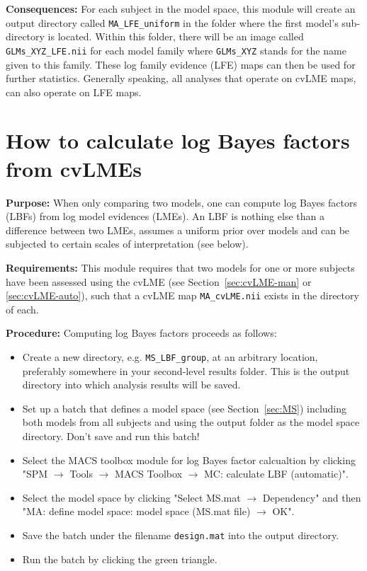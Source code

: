 \documentclass[a4paper,12pt]{article}
\newcommand{\ra}{$\rightarrow$ }
\begin{document}
\textbf{Consequences:} For each subject in the model space, this module will create an output directory called \texttt{MA\_LFE\_uniform} in the folder where the first model's sub-directory is located. Within this folder, there will be an image called \texttt{GLMs\_XYZ\_LFE.nii} for each model family where \texttt{GLMs\_XYZ} stands for the name given to this family. These log family evidence (LFE) maps can then be used for further statistics. Generally speaking, all analyses that operate on cvLME maps, can also operate on LFE maps.



\pagebreak
{}
\section{How to calculate log Bayes factors from cvLMEs} \label{sec:LBF}

\textbf{Purpose:} When only comparing two models, one can compute log Bayes factors (LBFs) from log model evidences (LMEs). An LBF is nothing else than a difference between two LMEs, assumes a uniform prior over models and can be subjected to certain scales of interpretation (see below).

\textbf{Requirements:} This module requires that two models for one or more subjects have been assessed using the cvLME (see Section~\ref{sec:cvLME-man} or \ref{sec:cvLME-auto}), such that a cvLME map \texttt{MA\_cvLME.nii} exists in the directory of each.

\textbf{Procedure:} Computing log Bayes factors proceeds as follows:
\begin{itemize}

\item
Create a new directory, e.g. \texttt{MS\_LBF\_group}, at an arbitrary location, preferably somewhere in your second-level results folder. This is the output directory into which analysis results will be saved.

\item
Set up a batch that defines a model space (see Section~\ref{sec:MS}) including both models from all subjects and using the output folder as the model space directory. Don't save and run this batch!

\item
Select the MACS toolbox module for log Bayes factor calcualtion by clicking \linebreak[4] "SPM \ra Tools \ra MACS Toolbox \ra MC: calculate LBF (automatic)".

\item
Select the model space by clicking "Select MS.mat \ra Dependency" and then \linebreak[4] "MA: define model space: model space (MS.mat file) \ra OK".

\item
Save the batch under the filename \texttt{design.mat} into the output directory.

\item
Run the batch by clicking the green triangle.

\end{itemize}
\end{document}
